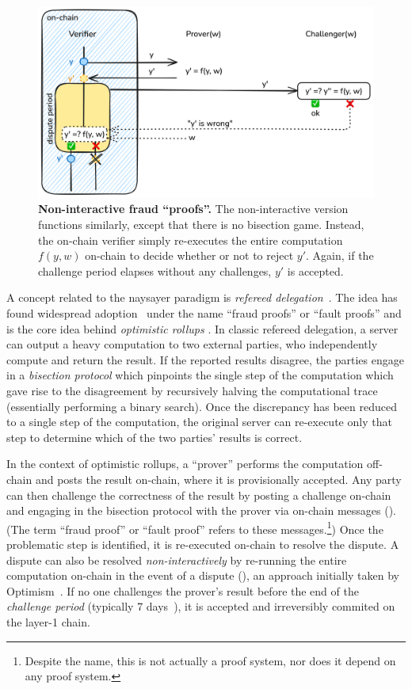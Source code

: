  \begin{figure}[tbh]
    \includegraphics[width=\textwidth]{naysayer/figs/fraud-NI.png}
    \caption{\textbf{Non-interactive fraud ``proofs''.} The non-interactive version functions similarly, except that there is no bisection game. Instead, the on-chain verifier simply re-executes the entire computation $f(y, w)$ on-chain to decide whether or not to reject $y'$. Again, if the challenge period elapses without any challenges, $y'$ is accepted.}
    \label{fig:fraud-NI}
 \end{figure}

A concept related to the naysayer paradigm is \emph{refereed delegation}~\cite{STOC:FeiKil97}. The idea has found widespread adoption~\cite{ARXIV:TeuRei19,USENIX:KGCWF18,ARXIV:AABBBE24} under the name ``fraud proofs'' or ``fault proofs'' and is the core idea behind \emph{optimistic rollups} \cite{ethereum_optimistic,arbitrum_nitro,optimism_rollup}. In classic refereed delegation, a server can output a heavy computation to two external parties, who independently compute and return the result. If the reported results disagree, the parties engage in a \emph{bisection protocol} which pinpoints the single step of the computation which gave rise to the disagreement by recursively halving the computational trace (essentially performing a binary search). Once the discrepancy has been reduced to a single step of the computation, the original server can re-execute only that step to determine which of the two parties' results is correct. 

In the context of optimistic rollups, a ``prover'' performs the computation off-chain and posts the result on-chain, where it is provisionally accepted. Any party can then challenge the correctness of the result by posting a challenge on-chain and engaging in the bisection protocol with the prover via on-chain messages (). (The term ``fraud proof'' or ``fault proof'' refers to these messages.\footnote{Despite the name, this is not actually a proof system, nor does it depend on any proof system.}) Once the problematic step is identified, it is re-executed on-chain to resolve the dispute. A dispute can also be resolved \emph{non-interactively} by re-running the entire computation on-chain in the event of a dispute (), an approach initially taken by Optimism~\cite{optimism_v1,buckland_fraudproofs}.
If no one challenges the prover's result before the end of the \emph{challenge period} (typically 7 days~\cite{why7days}), it is accepted and irreversibly commited on the layer-1 chain.


